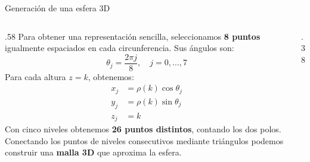 \documentclass[main.tex]{subfiles}
\begin{document}
\begin{frame}{Generación de una esfera 3D}
\begin{columns}[c]
\begin{column}{.58\textwidth}
Para obtener una representación sencilla, seleccionamos \textbf{8 puntos} igualmente espaciados en cada circunferencia.
\medskip
Sus ángulos son:
\[\theta_j=\frac{2\pi j}{8},\quad j=0,\ldots,7\]
Para cada altura $z=k$, obtenemos:
\[
\begin{aligned}
x_j&=\rho(k)\cos\theta_j\\
y_j&=\rho(k)\sin\theta_j\\
z_j&=k
\end{aligned}
\]
Con cinco niveles obtenemos \textbf{26 puntos distintos}, contando los dos polos.
\medskip
Conectando los puntos de niveles consecutivos mediante triángulos podemos construir una \textbf{malla 3D} que aproxima la esfera.
\end{column}
\begin{column}{.38\textwidth}
\centering
{}
\end{column}
\end{columns}
\end{frame}
\end{document}
